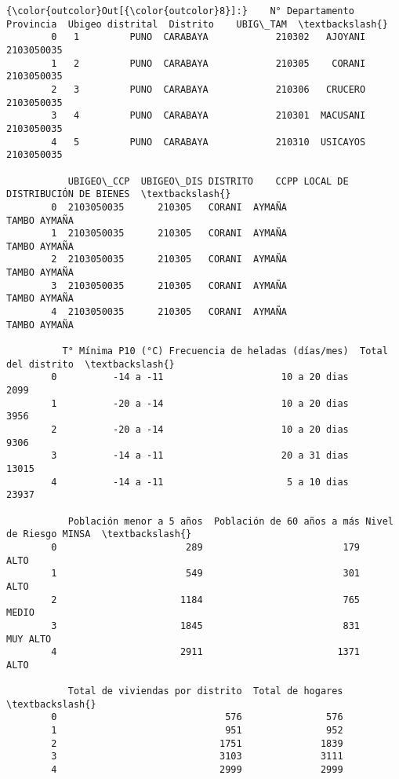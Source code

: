 \documentclass[11pt]{article}
\begin{document}
\begin{Verbatim}[commandchars=\\\{\}]
{\color{outcolor}Out[{\color{outcolor}8}]:}    N° Departamento Provincia  Ubigeo distrital  Distrito    UBIG\_TAM  \textbackslash{}
        0   1         PUNO  CARABAYA            210302   AJOYANI  2103050035   
        1   2         PUNO  CARABAYA            210305    CORANI  2103050035   
        2   3         PUNO  CARABAYA            210306   CRUCERO  2103050035   
        3   4         PUNO  CARABAYA            210301  MACUSANI  2103050035   
        4   5         PUNO  CARABAYA            210310  USICAYOS  2103050035   
        
           UBIGEO\_CCP  UBIGEO\_DIS DISTRITO    CCPP LOCAL DE DISTRIBUCIÓN DE BIENES  \textbackslash{}
        0  2103050035      210305   CORANI  AYMAÑA                    TAMBO AYMAÑA   
        1  2103050035      210305   CORANI  AYMAÑA                    TAMBO AYMAÑA   
        2  2103050035      210305   CORANI  AYMAÑA                    TAMBO AYMAÑA   
        3  2103050035      210305   CORANI  AYMAÑA                    TAMBO AYMAÑA   
        4  2103050035      210305   CORANI  AYMAÑA                    TAMBO AYMAÑA   
        
          T° Mínima P10 (°C) Frecuencia de heladas (días/mes)  Total del distrito  \textbackslash{}
        0          -14 a -11                     10 a 20 dias                2099   
        1          -20 a -14                     10 a 20 dias                3956   
        2          -20 a -14                     10 a 20 dias                9306   
        3          -14 a -11                     20 a 31 dias               13015   
        4          -14 a -11                      5 a 10 dias               23937   
        
           Población menor a 5 años  Población de 60 años a más Nivel de Riesgo MINSA  \textbackslash{}
        0                       289                         179                  ALTO   
        1                       549                         301                  ALTO   
        2                      1184                         765                 MEDIO   
        3                      1845                         831              MUY ALTO   
        4                      2911                        1371                  ALTO   
        
           Total de viviendas por distrito  Total de hogares  \textbackslash{}
        0                              576               576   
        1                              951               952   
        2                             1751              1839   
        3                             3103              3111   
        4                             2999              2999   
        

\end{Verbatim}
\end{document}
